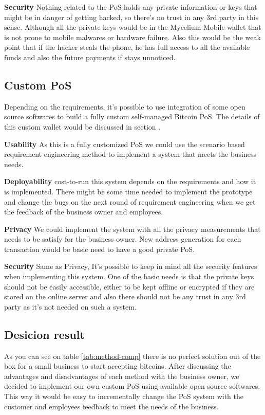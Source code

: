  \textbf{Security}
Nothing related to the PoS holds any private information or keys that might be in danger of getting hacked, so there's no trust in any 3rd party in this sense. Although all the private keys would be in the Mycelium Mobile wallet that is not prone to mobile malwares or hardware failure. Also this would be the weak point that if the hacker steals the phone, he has full access to all the available funds and also the future payments if stays unnoticed.

\subsection{Custom PoS}
Depending on the requirements, it's possible to use integration of some open source softwares to build a fully custom self-managed Bitcoin PoS. The details of this custom wallet would be discussed in section .

 \textbf{Usability}
As this is a fully customized PoS we could use the scenario based requirement engineering method to implement a system that meets the business needs.

 \textbf{Deployability}
cost-to-run this system depends on the requirements and how it is implemented. There might be some time needed to implement the prototype and change the bugs on the next round of requirement engineering when we get the feedback of the business owner and employees.

 \textbf{Privacy}
We could implement the system with all the privacy measurements that needs to be satisfy for the business owner. New address generation for each transaction would be basic need to have a good private PoS.

 \textbf{Security}
Same as Privacy, It's possible to keep in mind all the security features when implementing this system. One of the basic needs is that the private keys should not be easily accessible, either to be kept offline or encrypted if they are stored on the online server and also there should not be any trust in any 3rd party as it's not needed on such a system.

\subsection{Desicion result}
As you can see on table \ref{tab:method-comp} there is no perfect solution out of the box for a small business to start accepting bitcoins. After discussing the advantages and disadvantages of each method with the business owner, we decided to implement our own custom PoS using available open source softwares. This way it would be easy to incrementally change the PoS system with the customer and employees feedback to meet the needs of the business.

